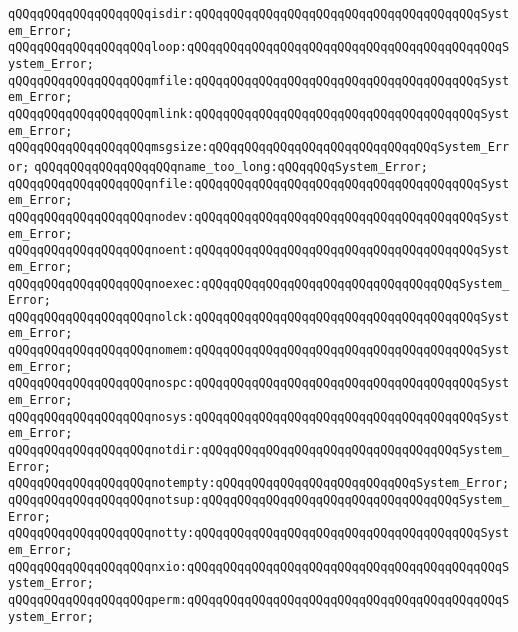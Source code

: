 \verb|qQQqqQQqqQQqqQQqqQQqisdir:qQQqqQQqqQQqqQQqqQQqqQQqqQQqqQQqqQQqqQQqSystem_Error;|\newline
\verb|qQQqqQQqqQQqqQQqqQQqloop:qQQqqQQqqQQqqQQqqQQqqQQqqQQqqQQqqQQqqQQqqQQqSystem_Error;|\newline
\verb|qQQqqQQqqQQqqQQqqQQqmfile:qQQqqQQqqQQqqQQqqQQqqQQqqQQqqQQqqQQqqQQqSystem_Error;|\newline
\verb|qQQqqQQqqQQqqQQqqQQqmlink:qQQqqQQqqQQqqQQqqQQqqQQqqQQqqQQqqQQqqQQqSystem_Error;|\newline
\verb|qQQqqQQqqQQqqQQqqQQqmsgsize:qQQqqQQqqQQqqQQqqQQqqQQqqQQqqQQqSystem_Error;|\newline
\verb|qQQqqQQqqQQqqQQqqQQqname_too_long:qQQqqQQqSystem_Error;|\newline
\verb|qQQqqQQqqQQqqQQqqQQqnfile:qQQqqQQqqQQqqQQqqQQqqQQqqQQqqQQqqQQqqQQqSystem_Error;|\newline
\verb|qQQqqQQqqQQqqQQqqQQqnodev:qQQqqQQqqQQqqQQqqQQqqQQqqQQqqQQqqQQqqQQqSystem_Error;|\newline
\verb|qQQqqQQqqQQqqQQqqQQqnoent:qQQqqQQqqQQqqQQqqQQqqQQqqQQqqQQqqQQqqQQqSystem_Error;|\newline
\verb|qQQqqQQqqQQqqQQqqQQqnoexec:qQQqqQQqqQQqqQQqqQQqqQQqqQQqqQQqqQQqSystem_Error;|\newline
\verb|qQQqqQQqqQQqqQQqqQQqnolck:qQQqqQQqqQQqqQQqqQQqqQQqqQQqqQQqqQQqqQQqSystem_Error;|\newline
\verb|qQQqqQQqqQQqqQQqqQQqnomem:qQQqqQQqqQQqqQQqqQQqqQQqqQQqqQQqqQQqqQQqSystem_Error;|\newline
\verb|qQQqqQQqqQQqqQQqqQQqnospc:qQQqqQQqqQQqqQQqqQQqqQQqqQQqqQQqqQQqqQQqSystem_Error;|\newline
\verb|qQQqqQQqqQQqqQQqqQQqnosys:qQQqqQQqqQQqqQQqqQQqqQQqqQQqqQQqqQQqqQQqSystem_Error;|\newline
\verb|qQQqqQQqqQQqqQQqqQQqnotdir:qQQqqQQqqQQqqQQqqQQqqQQqqQQqqQQqqQQqSystem_Error;|\newline
\verb|qQQqqQQqqQQqqQQqqQQqnotempty:qQQqqQQqqQQqqQQqqQQqqQQqqQQqSystem_Error;|\newline
\verb|qQQqqQQqqQQqqQQqqQQqnotsup:qQQqqQQqqQQqqQQqqQQqqQQqqQQqqQQqqQQqSystem_Error;|\newline
\verb|qQQqqQQqqQQqqQQqqQQqnotty:qQQqqQQqqQQqqQQqqQQqqQQqqQQqqQQqqQQqqQQqSystem_Error;|\newline
\verb|qQQqqQQqqQQqqQQqqQQqnxio:qQQqqQQqqQQqqQQqqQQqqQQqqQQqqQQqqQQqqQQqqQQqSystem_Error;|\newline
\verb|qQQqqQQqqQQqqQQqqQQqperm:qQQqqQQqqQQqqQQqqQQqqQQqqQQqqQQqqQQqqQQqqQQqSystem_Error;|\newline
